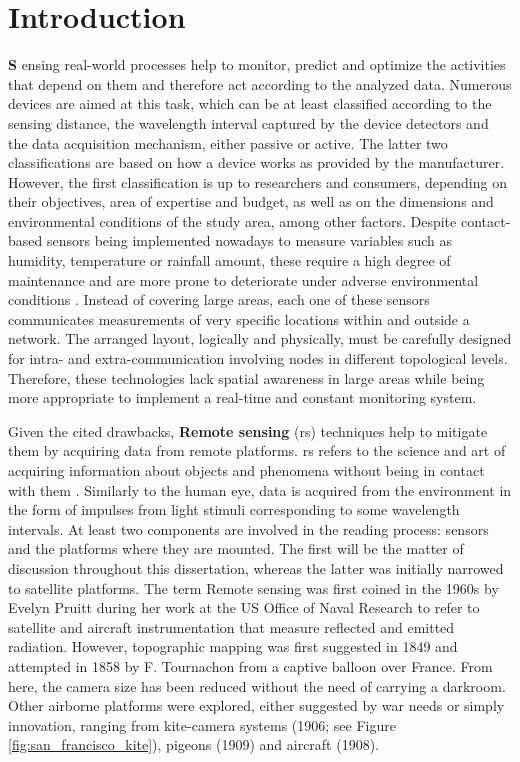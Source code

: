 \setchapterpreamble[u]{\margintoc}
\chapter{Introduction}

\lettrine[findent=0pt, lines=3]{\textbf{S}}{ }ensing real-world processes help to monitor, predict and optimize the activities that depend on them and therefore act according to the analyzed data. Numerous devices are aimed at this task, which can be at least classified according to the sensing distance, the wavelength interval captured by the device detectors and the data acquisition mechanism, either passive or active. The latter two classifications are based on how a device works as provided by the manufacturer. However, the first classification is up to researchers and consumers, depending on their objectives, area of expertise and budget, as well as on the dimensions and environmental conditions of the study area, among other factors. Despite contact-based sensors being implemented nowadays to measure variables such as humidity, temperature or rainfall amount, these require a high degree of maintenance and are more prone to deteriorate under adverse environmental conditions \cite{silva_low-cost_2019, morais_versatile_2021}. Instead of covering large areas, each one of these sensors communicates measurements of very specific locations within and outside a network. The arranged layout, logically and physically, must be carefully designed for intra- and extra-communication involving nodes in different topological levels. Therefore, these technologies lack spatial awareness in large areas while being more appropriate to implement a real-time and constant monitoring system. 

Given the cited drawbacks, \textbf{Remote sensing} (\acrshort{rs}) techniques help to mitigate them by acquiring data from remote platforms. \acrshort{rs} refers to the science and art of acquiring information about objects and phenomena without being in contact with them \cite{lillesand_remote_2015}. Similarly to the human eye, data is acquired from the environment in the form of impulses from light stimuli corresponding to some wavelength intervals. At least two components are involved in the reading process: sensors and the platforms where they are mounted. The first will be the matter of discussion throughout this dissertation, whereas the latter was initially narrowed to satellite platforms. The term Remote sensing was first coined in the 1960s by Evelyn Pruitt during her work at the US Office of Naval Research to refer to satellite and aircraft instrumentation that measure reflected and emitted radiation. However, topographic mapping was first suggested in 1849 and attempted in 1858 by F. Tournachon from a captive balloon over France. From here, the camera size has been reduced without the need of carrying a darkroom. Other airborne platforms were explored, either suggested by war needs or simply innovation, ranging from kite-camera systems (1906; see Figure \ref{fig:san_francisco_kite}), pigeons (1909) and aircraft (1908).

